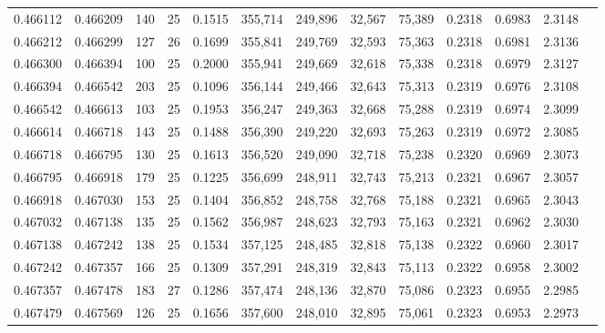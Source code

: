 \begin{tabular}{rrrrrrrrrrrrr}
0.466112 & 0.466209 &   140 &  25 &                                     0.1515 & 355,714 & 249,896 &  32,567 &  75,389 & 0.2318 & 0.6983 & 2.3148 \\
0.466212 & 0.466299 &   127 &  26 &                                     0.1699 & 355,841 & 249,769 &  32,593 &  75,363 & 0.2318 & 0.6981 & 2.3136 \\
0.466300 & 0.466394 &   100 &  25 &                                     0.2000 & 355,941 & 249,669 &  32,618 &  75,338 & 0.2318 & 0.6979 & 2.3127 \\
0.466394 & 0.466542 &   203 &  25 &                                     0.1096 & 356,144 & 249,466 &  32,643 &  75,313 & 0.2319 & 0.6976 & 2.3108 \\
0.466542 & 0.466613 &   103 &  25 &                                     0.1953 & 356,247 & 249,363 &  32,668 &  75,288 & 0.2319 & 0.6974 & 2.3099 \\
0.466614 & 0.466718 &   143 &  25 &                                     0.1488 & 356,390 & 249,220 &  32,693 &  75,263 & 0.2319 & 0.6972 & 2.3085 \\
0.466718 & 0.466795 &   130 &  25 &                                     0.1613 & 356,520 & 249,090 &  32,718 &  75,238 & 0.2320 & 0.6969 & 2.3073 \\
0.466795 & 0.466918 &   179 &  25 &                                     0.1225 & 356,699 & 248,911 &  32,743 &  75,213 & 0.2321 & 0.6967 & 2.3057 \\
0.466918 & 0.467030 &   153 &  25 &                                     0.1404 & 356,852 & 248,758 &  32,768 &  75,188 & 0.2321 & 0.6965 & 2.3043 \\
0.467032 & 0.467138 &   135 &  25 &                                     0.1562 & 356,987 & 248,623 &  32,793 &  75,163 & 0.2321 & 0.6962 & 2.3030 \\
0.467138 & 0.467242 &   138 &  25 &                                     0.1534 & 357,125 & 248,485 &  32,818 &  75,138 & 0.2322 & 0.6960 & 2.3017 \\
0.467242 & 0.467357 &   166 &  25 &                                     0.1309 & 357,291 & 248,319 &  32,843 &  75,113 & 0.2322 & 0.6958 & 2.3002 \\
0.467357 & 0.467478 &   183 &  27 &                                     0.1286 & 357,474 & 248,136 &  32,870 &  75,086 & 0.2323 & 0.6955 & 2.2985 \\
0.467479 & 0.467569 &   126 &  25 &                                     0.1656 & 357,600 & 248,010 &  32,895 &  75,061 & 0.2323 & 0.6953 & 2.2973 \\

\end{tabular}
